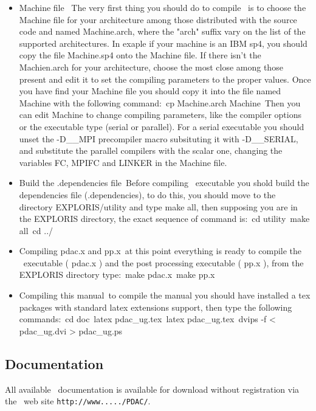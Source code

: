 \begin{itemize}

\item Machine file \
      The very first thing you should do to compile \PDAC\ is to choose
      the Machine file for your architecture among those distributed with
      the source code and named Machine.arch, where the "arch" suffix
      vary on the list of the supported architectures. In exaple if
      your machine is an IBM sp4, you should copy the file Machine.sp4
      onto the Machine file. If there isn't the Machien.arch for 
      your architecture, choose the most close among those present
      and edit it to set the compiling parameters to the proper values.
      Once you have find your Machine file you should copy it into the
      file named Machine with the following command:\
      cp Machine.arch Machine\
      Then you can edit Machine to change compiling parameters,
      like the compiler options or the executable type (serial or parallel).
      For a serial executable you should unset the -D\_\_MPI precompiler macro
      subsituting it with -D\_\_SERIAL, and substitute the parallel compilers
      with the scalar one, changing the variables FC, MPIFC and LINKER
      in the Machine file.

\item Build the .dependencies file\
      Before compiling \PDAC\ executable you shold build the 
      dependencies file (.dependencies), to do this, you should
      move to the directory  EXPLORIS/utility and type make all,
      then supposing you are in the EXPLORIS directory, 
      the exact sequence of command is:\
      cd utility\
      make all\
      cd ../\

\item Compiling pdac.x and pp.x\
      at this point everything is ready to compile the \PDAC\ executable
      ( pdac.x ) and the post processing executable ( pp.x ), from
      the EXPLORIS directory type:\
      make pdac.x\
      make pp.x\

\item Compiling this manual\
      to compile the manual you should have installed a tex packages
      with standard latex extensions support, then type the following commands:\
      cd doc\
      latex pdac\_ug.tex\
      latex pdac\_ug.tex\
      dvips -f < pdac\_ug.dvi > pdac\_ug.ps

\end{itemize}

\subsection{Documentation}

All available \PDAC\ documentation is available for download without
registration via the \PDAC\ web site
{\tt http://www...../PDAC/}.

